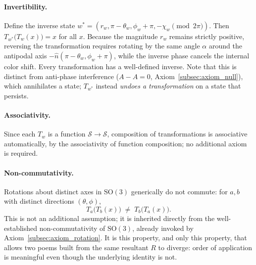 \documentclass[12pt, a4paper]{article}
\begin{document}
\paragraph{Invertibility.} Define the inverse state $w^{*} = (r_w, \pi - \theta_w, \phi_w + \pi, -\chi_w \pmod{2\pi})$. 
Then $T_{w^{*}}\!\big(T_w(x)\big) = x$ for all $x$. Because the magnitude $r_w$ remains strictly positive, reversing the transformation requires rotating by the same angle $\alpha$ around the antipodal axis $-\hat{n}(\pi - \theta_w, \phi_w + \pi)$, while the inverse phase cancels the internal color shift. Every transformation has a well-defined inverse. Note that this is distinct from anti-phase interference ($A - A = 0$, Axiom~\ref{subsec:axiom_null}), which annihilates a state; $T_{w^{*}}$ instead \emph{undoes a transformation} on a state that persists.

\paragraph{Associativity.} Since each $T_w$ is a function
$\mathcal{S} \to \mathcal{S}$, composition of transformations is
associative automatically, by the associativity of function
composition; no additional axiom is required.

\paragraph{Non-commutativity.} Rotations about distinct axes in
$\mathrm{SO}(3)$ generically do not commute: for $a, b$ with distinct
directions $(\theta,\phi)$,
\begin{equation}
    T_a\big(T_b(x)\big) \;\neq\; T_b\big(T_a(x)\big).
    \label{eq:noncommute}
\end{equation}
This is not an additional assumption; it is inherited directly from
the well-established non-commutativity of $\mathrm{SO}(3)$, already
invoked by Axiom~\ref{subsec:axiom_rotation}. It is this property,
and only this property, that allows two poems built from the same
resultant $R$ to diverge: order of application is meaningful even
though the underlying identity is not.
\end{document}
